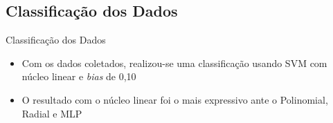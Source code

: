 \documentclass{beamer}
\begin{document}
% 
% 	

\subsection{Classificação dos Dados}
\begin{frame}{Classificação dos Dados}
	\begin{block}{}
		\begin{itemize}
			\item	Com os dados coletados, realizou-se uma classificação usando SVM com núcleo linear e \textit{bias} de 0,10
			\item	O resultado com o núcleo linear foi o mais expressivo ante o Polinomial, Radial e MLP
		\end{itemize}
	\end{block}
\end{frame}
\end{document}
